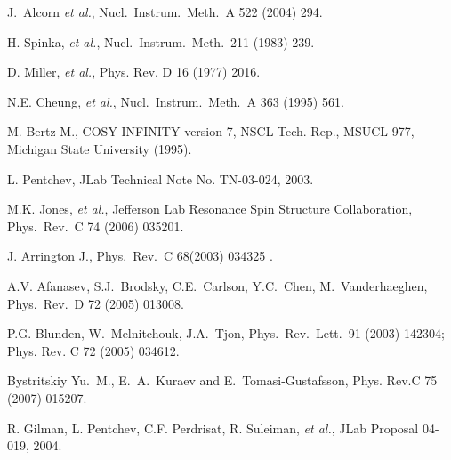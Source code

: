 \begin{thebibliography}{PPV06}
  J.~Alcorn {\it et al.},
  Nucl.\ Instrum.\ Meth.\  A  522 (2004) 294.

H. Spinka, {\it et al.},
  Nucl.\ Instrum.\ Meth.\  211 (1983) 239.

D. Miller, {\it et al.}, Phys. Rev. D 16 (1977) 2016.

  N.E. Cheung, {\it et al.},
  Nucl.\ Instrum.\ Meth.\ A  363 (1995) 561.

M. Bertz M., COSY INFINITY version 7, NSCL Tech. Rep., MSUCL-977, 
Michigan State University (1995).

L. Pentchev, JLab Technical Note No. TN-03-024, 2003.

M.K. Jones, {\it et al.}, Jefferson Lab Resonance Spin Structure
                  Collaboration,
  Phys.\ Rev.\ C 74 (2006) 035201.

  J. Arrington J.,
  Phys.\ Rev.\ C 68(2003) 034325 .

A.V. Afanasev, S.J.~Brodsky, C.E.~Carlson, Y.C.~Chen, M.~Vanderhaeghen,
Phys.\ Rev.\ D 72 (2005) 013008.

P.G. Blunden, W.~Melnitchouk, J.A.~Tjon,
Phys.\ Rev.\ Lett.\  91 (2003) 142304; 
Phys. Rev. C 72 (2005) 034612.

 Bystritskiy Yu.~M., E.~A.~Kuraev and E.~Tomasi-Gustafsson,
Phys. Rev.C 75 (2007) 015207.   

R. Gilman, L. Pentchev, C.F. Perdrisat, R. Suleiman, {\it et al.}, JLab Proposal 04-019, 2004.


\end{thebibliography}
